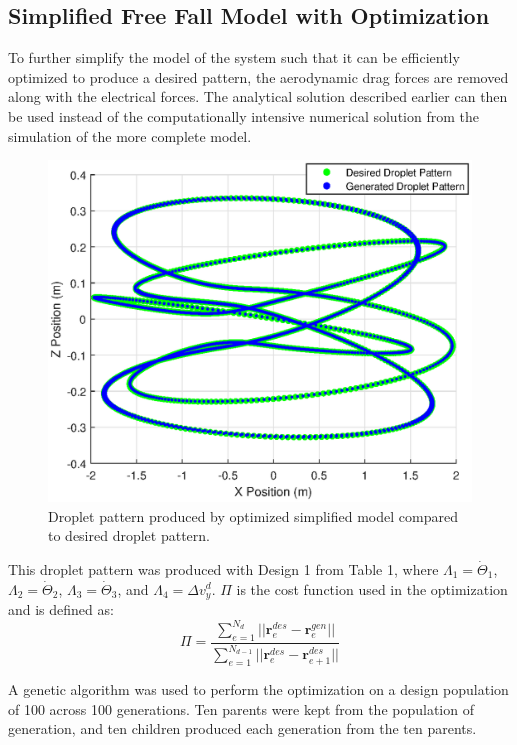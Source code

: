 \documentclass[a4paper,12pt]{report}
\begin{document}
\subsection{Simplified Free Fall Model with Optimization}
To further simplify the model of the system such that it can be efficiently optimized to produce a desired pattern, the aerodynamic drag forces are removed along with the electrical forces. The analytical solution described earlier can then be used instead of the computationally intensive numerical solution from the simulation of the more complete model.

\begin{figure}[H]
\begin{nscenter}
  \includegraphics[width=0.75\linewidth]{part2_3.eps}
  \caption{Droplet pattern produced by optimized simplified model compared to desired droplet pattern.}
  \end{nscenter}
\end{figure}

This droplet pattern was produced with Design 1 from Table 1, where $\Lambda_1 = \dot{\Theta}_1$, $\Lambda_2 = \dot{\Theta}_2$, $\Lambda_3 = \dot{\Theta}_3$, and $\Lambda_4 = \Delta v^d_y$. $\Pi$ is the cost function used in the optimization and is defined as:
$$ \Pi = \frac{\sum_{e=1}^{N_d}||\bm{r}_e^{des} - \bm{r}_e^{gen}||}{\sum_{e=1}^{N_{d-1}}||\bm{r}_e^{des} - \bm{r}_{e+1}^{des}||} $$

A genetic algorithm was used to perform the optimization on a design population of 100 across 100 generations. Ten parents were kept from the population of generation, and ten children produced each generation from the ten parents.
\end{document}
